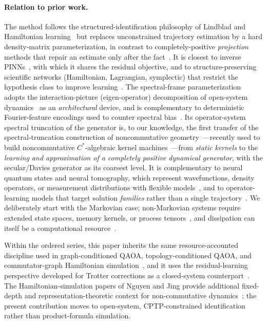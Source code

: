 \documentclass[11pt]{article}
\begin{document}
\paragraph{Relation to prior work.}
The method follows the structured-identification philosophy of Lindblad and Hamiltonian learning~\cite{boulant2003robust,wang2017experimental} but replaces unconstrained trajectory estimation by a hard density-matrix parameterization, in contrast to completely-positive \emph{projection} methods that repair an estimate only after the fact~\cite{knee2018quantum}. It is closest to inverse PINNs~\cite{raissi2019physics,karniadakis2021physics,wang2022respecting}, with which it shares the residual objective, and to structure-preserving scientific networks (Hamiltonian, Lagrangian, symplectic) that restrict the hypothesis class to improve learning~\cite{greydanus2019hamiltonian,cranmer2020lagrangian,hairer2006geometric}. The spectral-frame parameterization adopts the interaction-picture (eigen-operator) decomposition of open-system dynamics~\cite{breuer2002theory,davies1974markovian} as an \emph{architectural} device, and is complementary to deterministic Fourier-feature encodings used to counter spectral bias~\cite{tancik2020fourier}. Its operator-system spectral truncation of the generator is, to our knowledge, the first transfer of the spectral-truncation construction of noncommutative geometry~\cite{connes2021spectral,vansuijlekom2021gromov}---recently used to build noncommutative $C^*$-algebraic kernel machines~\cite{hashimoto2024spectral}---from \emph{static kernels} to the \emph{learning and approximation of a completely positive dynamical generator}, with the secular/Davies generator as its coarsest level. It is complementary to neural quantum states and neural tomography, which represent wavefunctions, density operators, or measurement distributions with flexible models~\cite{carleo2017solving,torlai2018neural,yoshioka2020variational}, and to operator-learning models that target solution \emph{families} rather than a single trajectory~\cite{chen2018neural,lu2021learning,li2021fourier}. We deliberately start with the Markovian case; non-Markovian systems require extended state spaces, memory kernels, or process tensors~\cite{denisov2019open,wolf2008assessing,banchi2018modelling,luchnikov2020machine}, and dissipation can itself be a computational resource~\cite{verstraete2009quantum}.

Within the ordered series, this paper inherits the same resource-accounted
discipline used in graph-conditioned QAOA, topology-conditioned QAOA, and
commutator-graph Hamiltonian simulation~\cite{huynh2026gctr,huynh2026topoqaoa,huynh2026topoham},
and it uses the residual-learning perspective developed for Trotter
corrections as a closed-system counterpart~\cite{huynh2026liergtc}.  The
Hamiltonian-simulation papers of Nguyen and Jing provide additional fixed-depth
and representation-theoretic context for non-commutative
dynamics~\cite{nguyen2025zassenhaus,jing2026complexity}; the present contribution moves
to open-system, CPTP-constrained identification rather than product-formula
simulation.
\end{document}
